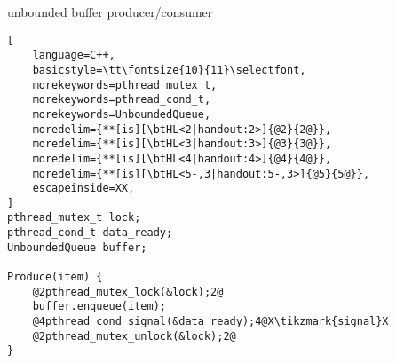 \usetikzlibrary{arrows.meta,fit,matrix}

\begin{frame}[fragile,label=unboundedPC]{unbounded buffer producer/consumer}
\begin{lstlisting}[
    language=C++,
    basicstyle=\tt\fontsize{10}{11}\selectfont,
    morekeywords=pthread_mutex_t,
    morekeywords=pthread_cond_t,
    morekeywords=UnboundedQueue,
    moredelim={**[is][\btHL<2|handout:2>]{@2}{2@}}, 
    moredelim={**[is][\btHL<3|handout:3>]{@3}{3@}}, 
    moredelim={**[is][\btHL<4|handout:4>]{@4}{4@}}, 
    moredelim={**[is][\btHL<5-,3|handout:5-,3>]{@5}{5@}}, 
    escapeinside=XX,
]
pthread_mutex_t lock;
pthread_cond_t data_ready;
UnboundedQueue buffer;

Produce(item) {
    @2pthread_mutex_lock(&lock);2@
    buffer.enqueue(item);
    @4pthread_cond_signal(&data_ready);4@X\tikzmark{signal}X
    @2pthread_mutex_unlock(&lock);2@
}


\end{lstlisting}
\end{frame}
